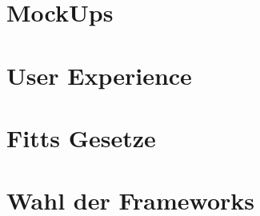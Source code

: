 \section{MockUps}

\section{User Experience}

\section{Fitts Gesetze}

\section{Wahl der Frameworks}
